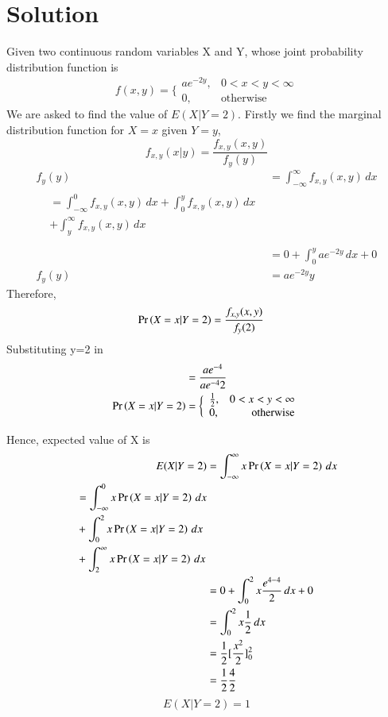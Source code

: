 \documentclass[journal,12pt,twocolumn]{IEEEtran}
\begin{document}
\section{\textbf{Solution}}
Given two continuous random variables X and Y, whose joint probability distribution function is\newline
\begin{equation}
    f(x,y) = \bigg\{ \begin{array}{lr}
    ae^{-2y}, & 0<x<y<\infty  \\
     0, &\text{otherwise} 
\end{array}
\end{equation}
We are asked to find the value of $E(X|Y=2)$. 
Firstly we find the marginal distribution function for $X=x$ given $Y=y$,
\begin{equation}
    f_{x,y}(x|y) = \frac{f_{x,y}(x,y)}{f_y(y)}
\end{equation}
\begin{align}
    f_y(y) &= \int_{-\infty}^{\infty} f_{x,y}(x,y) \,dx \\
    \begin{split}
         &= \int_{-\infty}^{0} f_{x,y}(x,y) \,dx + \int_{0}^{y} f_{x,y}(x,y) \,dx \\
        &+ \int_{y}^{\infty} f_{x,y}(x,y) \,dx\\
    \end{split}\\
    &= 0 + \int_0^y ae^{-2y} \,dx + 0 \\
    f_y(y) &= ae^{-2y}y
\end{align}
Therefore,
\begin{align}
    \Pr\left(X=x|Y=2\right) &= \frac{f_{x,y}(x,y)}{f_y(2)}
    \end{align}
Substituting y=2 in 
\begin{align}
     &= \frac{ae^{-4}}{ae^{-4}2} \\
    \Pr\left(X=x|Y=2\right) &= \bigg\{ \begin{array}{lr}
    \frac{1}{2}, & 0<x<y<\infty  \\
     0, &\text{otherwise} 
\end{array}
\end{align}
   

Hence, expected value of X is
\begin{align}
    E(X|Y=2) &= \int_{-\infty}^{\infty} x\Pr\left(X=x|Y=2\right) \,dx \\
    \begin{split}
        &= \int_{-\infty}^{0} x\Pr\left(X=x|Y=2\right) \,dx \\
        &+ \int_{0}^{2} x\Pr\left(X=x|Y=2\right) \,dx\\
        &+ \int_{2}^{\infty} x\Pr\left(X=x|Y=2\right) \,dx
    \end{split} \\
    &= 0+ \int_{0}^{2} x\frac{e^{4-4}}{2}\,dx  +0 \\
    &= \int_0^2 x\frac{1}{2} \,dx \\
    &= \frac{1}{2}[\frac{x^2}{2}]_0^2 \\
    &= \frac{1}{2} \frac{4}{2} 
\end{align}
\begin{equation}
    \boxed{E(X|Y=2) = 1}
\end{equation}
\end{document}
